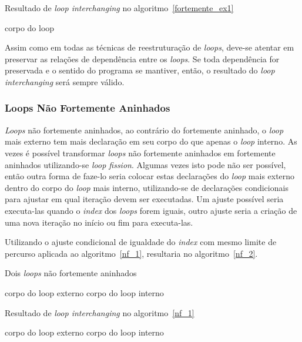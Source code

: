 \begin{algorithm}
\caption{Resultado de \textit{loop interchanging} no
        algoritmo~\ref{fortemente_ex1}}
\label{fortemente_ex2}
\begin{algorithmic}[1]

\STATE corpo do loop
\ENDFOR
\ENDFOR

\end{algorithmic}
\end{algorithm}

Assim como em todas as técnicas de reestruturação de \textit{loops}, deve-se
atentar em preservar as relações de dependência entre os \textit{loops}. 
Se toda dependência for preservada e o sentido do programa se mantiver, então, o
resultado do \textit{loop interchanging} será sempre válido.


\subsubsection{Loops Não Fortemente Aninhados}

\textit{Loops} não fortemente aninhados, ao contrário do fortemente aninhado, o
\textit{loop} mais externo tem mais declaração em seu corpo do que apenas o
\textit{loop} interno.
As vezes é  possível  transformar  \textit{loops} não fortemente aninhados em
fortemente aninhados utilizando-se \textit{loop fission}.
Algumas vezes isto pode não ser possível, então outra forma de faze-lo seria
colocar estas declarações do \textit{loop} mais externo dentro do corpo do
\textit{loop} mais interno, utilizando-se de declarações condicionais para
ajustar em qual iteração devem ser executadas. 
Um ajuste possível seria executa-las quando o \textit{index} dos \textit{loops}
forem iguais, outro ajuste seria a criação de uma nova iteração no início ou fim
para executa-las.

Utilizando o ajuste condicional de igualdade  do \textit{index} com mesmo limite
de percurso aplicada ao algoritmo~\ref{nf_1}, resultaria no
algoritmo~\ref{nf_2}.

\begin{algorithm}
\caption{Dois \textit{loops} não fortemente aninhados}
\label{nf_1}
\begin{algorithmic}[1]

\STATE corpo do loop externo
\STATE corpo do loop interno
\ENDFOR
\ENDFOR

\end{algorithmic}
\end{algorithm}

\begin{algorithm}
\caption{Resultado de \textit{loop interchanging} no algoritmo~\ref{nf_1}}
\label{nf_2}
\begin{algorithmic}[1]

\STATE corpo do loop externo
\ELSE
\STATE corpo do loop interno
\ENDIF
\ENDFOR
\ENDFOR

\end{algorithmic}
\end{algorithm}


